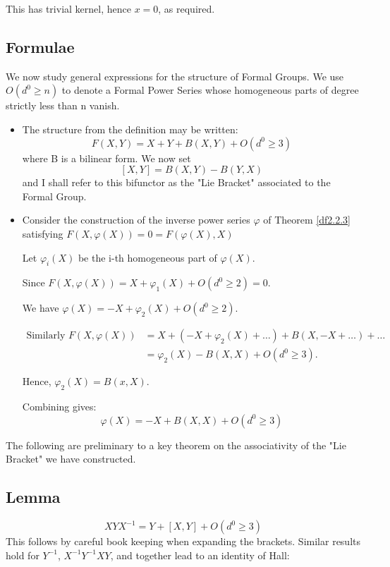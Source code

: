 This has trivial kernel, hence $x=0$, as required.






\subsection{Formulae}\label{df2.3.8}
We now study general expressions for the structure of Formal
Groups. We use $O(d^0 \geq n)$ to denote a Formal Power Series
whose homogeneous parts of degree strictly less than n vanish.

\begin{itemize}
    \item The structure from the definition may be written:
    $$F(X,Y) = X+Y +B(X,Y) + O(d^0\geq 3)$$ where B is a bilinear
    form. We now set
    $$[X,Y] = B(X,Y) - B(Y,X)$$ and I shall refer to this
    bifunctor as the "Lie Bracket" associated to the Formal Group.
    \item Consider the construction of the inverse power series
    $\varphi$ of Theorem \ref{df2.2.3} satisfying $F(X,
    \varphi(X)) = 0 = F(\varphi(X),X)$

    Let $\varphi_i(X)$ be the i-th homogeneous part of
    $\varphi(X)$.

    Since $F(X,\varphi(X)) = X+\varphi_1(X) + O(d^0\geq 2) = 0$.

    We have $\varphi(X) = -X +\varphi_2(X)+ O(d^0\geq 2)$.

    \begin{align}
    \nonumber \text{Similarly } F(X,\varphi(X)) &= X+(-X+\varphi_2(X) +\dots) +
    B(X,-X+\dots)+\dots\\ \nonumber &=\varphi_2(X) - B(X,X) + O(d^0\geq 3).
\end{align}

    Hence, $\varphi_2(X) = B(x,X)$.

    Combining gives:
    $$\varphi(X) = -X +B(X,X) + O(d^0\geq 3)$$

\end{itemize}

The following are preliminary to a key theorem on the
    associativity of the "Lie Bracket" we have constructed.

\subsection{Lemma}\label{df2.3.9}
$$XYX^{-1} = Y+ [X,Y] +O(d^0\geq 3)$$
This follows by careful book keeping when expanding the brackets.
Similar results hold for $Y^{-1}$, $X^{-1}Y^{-1}XY$, and together
lead to an identity of Hall:


